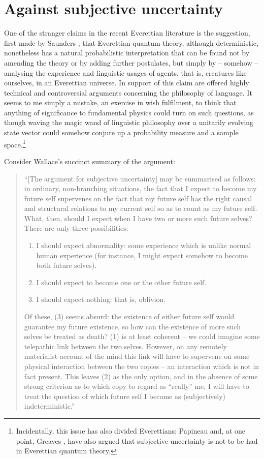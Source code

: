 \documentclass[aps,
pra,epsfig,12pt]{revtex4}
\begin{document}
\section{Against subjective uncertainty}

One of the stranger claims in the recent Everettian literature is the
suggestion, first made by Saunders \cite{saundersprob, 
saundersvol, saunderswallace, wallaceepiq}, 
that Everettian quantum
theory, although deterministic, nonetheless has a natural
probabilistic interpretation that can be found not by amending the theory or
by adding further postulates, but simply by -- somehow -- analysing the
experience and linguistic usages of agents, that is, creatures 
like ourselves, in an
Everettian universe.  In support of this claim are offered highly
technical and controversial arguments concerning the philosophy of language.
It seems to me simply a mistake, an exercise in wish fulfilment, to 
think that anything of significance to fundamental physics could turn on such 
questions, as though waving the magic wand of linguistic philosophy over
a unitarily evolving state vector could somehow conjure up 
a probability measure and a sample space.\footnote{Incidentally,
this issue has also divided Everettians: Papineau \cite{papineausu} 
and, at one point, Greaves \cite{greavessu},
have also argued that subjective uncertainty is not to be had in 
Everettian quantum theory.}   

Consider Wallace's succinct summary \cite{wallaceepiq} of the argument: 

\begin{quotation}
``[The argument for subjective uncertainty] may be summarised as
follows: in ordinary, non-branching situations, the fact that I expect to become
my future self supervenes on the fact that my future self has 
the right causal and
structural relations to my current self so as to count as my future self. What,
then, should I expect when I have two or more such future selves? There are
only three possibilities:
\begin{enumerate}
\item I should expect 
abnormality: some experience which is unlike normal human
experience (for instance, I might expect somehow to become both
future selves).
\item I should expect to become one or the other future self.
\item I should expect nothing: that is, oblivion.
\end{enumerate}

Of these, (3) seems absurd: the existence of either future self would guarantee
my future existence, so how can the existence of more such selves be treated
as death? (1) is at least coherent -- we could imagine some telepathic link
between the two selves. However, on any remotely materialist account of the
mind this link will have to supervene on some physical interaction between the
two copies -- an interaction which is not in fact present. This leaves (2) as the
only option, and in the absence of some strong criterion as to which copy to
regard as ``really'' me, I will have to treat 
the question of which future self I
become as (subjectively) indeterministic.''
\end{quotation}
\end{document}
